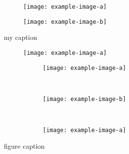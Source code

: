 \documentclass{article}
\begin{document}

    \begin{figure} \centering
        \begin{subfigure}[b]{\linewidth}
            \texttt{[image: example-image-a]}            
            \label{fig:a}
        \end{subfigure} %
    
        \begin{subfigure}[b]{\linewidth}    
            \texttt{[image: example-image-b]}
            \label{fig:b}    
        \end{subfigure} 
        \caption{my caption}
    \end{figure}


    \begin{figure}
        \begin{subfigure}{0.65\textwidth}
          \texttt{[image: example-image-a]}
        \end{subfigure}
        \hfill  %
        \begin{subfigure}{0.32\textwidth}
          \begin{subfigure}[t]{\textwidth}
            \texttt{[image: example-image-a]}   
          \end{subfigure}\\

          
          \begin{subfigure}[b]{\textwidth}
            \texttt{[image: example-image-b]}
          \end{subfigure}\\

          
          \begin{subfigure}[b]{\textwidth}
            \texttt{[image: example-image-a]}
          \end{subfigure}
        \end{subfigure}
    
        \caption{figure caption}
  \end{figure}
    
\end{document}
